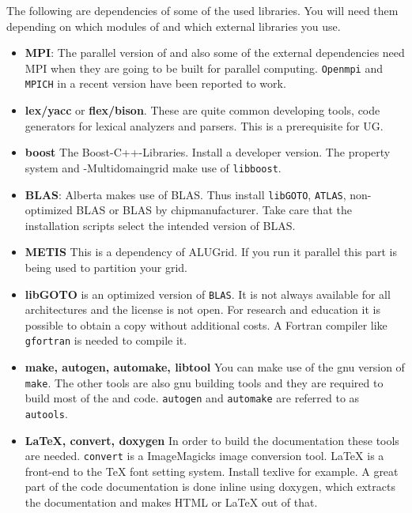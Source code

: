 The following are dependencies of some of the used libraries. You will need them depending on which modules of \Dune and which external libraries you use.
\begin{itemize}
\item \textbf{MPI}: The parallel version of \Dune and also some of the external dependencies need MPI when they are going to be built for parallel computing. \texttt{Openmpi} and \texttt{MPICH} in a recent version have been reported to work. 

\item \textbf{lex/yacc} or \textbf{flex/bison}. These are quite common developing tools, code generators for lexical analyzers and parsers. This is a prerequisite for UG.

\item \textbf{boost} The Boost-C++-Libraries. Install a developer version. The \Dumux property system and \Dune-Multidomaingrid make use of \texttt{libboost}.

\item \textbf{BLAS}: Alberta makes use of BLAS. Thus install \texttt{libGOTO}, \texttt{ATLAS}, non-optimized BLAS or BLAS by chipmanufacturer. Take care that the installation scripts select the intended version of BLAS. 

\item \textbf{METIS} This is a dependency of ALUGrid. If you run it parallel this part is being used to partition your grid.

\item \textbf{libGOTO} is an optimized version of \texttt{BLAS}. It is not always available for all architectures and 
the license is not open. For research and education it is possible to obtain a copy without additional costs.
A Fortran compiler like \texttt{gfortran} is needed to compile it.

\item \textbf{make, autogen, automake, libtool} 
You can make use of the gnu version of \texttt{make}. The other tools are also gnu building tools and they are required to build most of the \Dune and \Dumux code. \texttt{autogen} and \texttt{automake} are referred to as \texttt{autools}. 

\item \textbf{LaTeX, convert, doxygen} In order to build the \Dumux documentation these tools are needed. \texttt{convert} is a ImageMagicks image conversion tool. LaTeX is a front-end to the TeX font setting system. Install texlive for example. A great part of the code documentation is done inline using doxygen, which extracts the documentation and makes HTML or LaTeX out of that.


\end{itemize}
